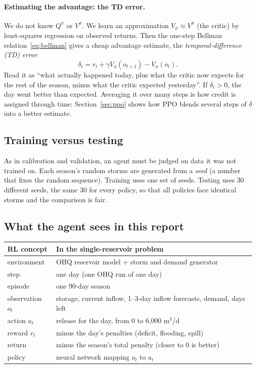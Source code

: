 \paragraph{Estimating the advantage: the TD error.} We do not know $Q^\pi$
or $V^\pi$. We learn an approximation $V_\phi\approx V^\pi$ (the critic)
by least-squares regression on observed returns. Then the one-step Bellman
relation~\eqref{eq:bellman} gives a cheap advantage estimate, the
\emph{temporal-difference (TD) error}
\begin{equation}
\delta_t=r_t+\gamma V_\phi(o_{t+1})-V_\phi(o_t).
\label{eq:td}
\end{equation}
Read it as ``what actually happened today, plus what the critic now
expects for the rest of the season, minus what the critic expected
yesterday''. If $\delta_t>0$, the day went better than expected. Averaging
it over many steps is how credit is assigned through time:
Section~\ref{sec:ppo} shows how PPO blends several steps of $\delta$ into a
better estimate.

\subsection{Training versus testing}
As in calibration and validation, an agent must be judged on data it was
not trained on. Each season's random storms are generated from a
\emph{seed} (a number that fixes the random sequence). Training uses one
set of seeds. Testing uses 30 different seeds, the same 30 for every
policy, so that all policies face identical storms and the comparison is
fair.

\subsection{What the agent sees in this report}
\begin{center}
\small
\begin{tabular}{p{}p{}}
\toprule
RL concept & In the single-reservoir problem\\
\midrule
environment & OHQ reservoir model + storm and demand generator\\
step & one day (one OHQ run of one day)\\
episode & one 90-day season\\
observation $o_t$ & storage, current inflow, 1--3-day inflow forecasts, demand, days left\\
action $a_t$ & release for the day, from 0 to 6{,}000 m$^3$/d\\
reward $r_t$ & minus the day's penalties (deficit, flooding, spill)\\
return & minus the season's total penalty (closer to 0 is better)\\
policy & neural network mapping $o_t$ to $a_t$\\
\bottomrule
\end{tabular}
\end{center}

